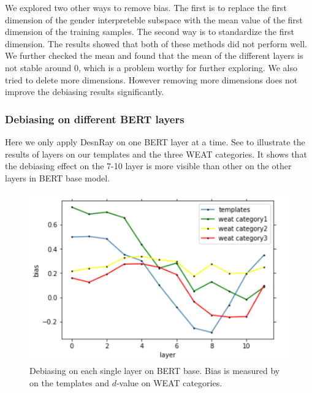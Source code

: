 We explored two other ways to remove bias. The first is to replace the first dimension of the gender interpreteble subspace with the mean value of the first dimension of the training samples. The second way is to standardize the first dimension. The results showed that both of these methods did not perform well. We further checked the mean and found that the mean of the different layers is not stable around 0, which is a problem worthy for further exploring. We also tried to delete more dimensions. However removing more dimensions does not improve the debiasing results significantly.


\subsubsection{Debiasing on different BERT layers}
Here we only apply DesnRay on one BERT layer at a time. See  to illustrate the results of layers on our templates and the three WEAT categories. It shows that the debiasing effect on the 7-10 layer is more visible than other on the other layers in BERT base model.
\begin{figure}
	\centering
	\includegraphics[width=0.9\linewidth]{layers_base}
	\caption{Debiasing on each single layer on BERT base. Bias is measured by  on the templates and $d$-value on WEAT categories. }
\end{figure}

